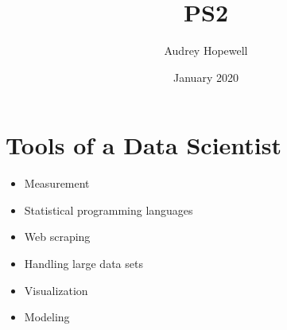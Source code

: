 \documentclass{article}
\title{PS2}
\author{Audrey Hopewell}
\date{January 2020}
\begin{document}
\maketitle

\section{Tools of a Data Scientist}
\begin{itemize}
    \item Measurement
    \item Statistical programming languages
    \item Web scraping
    \item Handling large data sets
    \item Visualization
    \item Modeling
\end{itemize}
\end{document}
